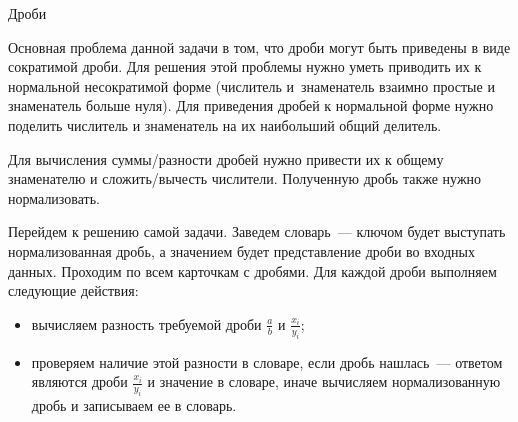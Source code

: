 \begin{tutorial}{Дроби}

Основная проблема данной задачи в том, что дроби могут быть приведены в виде сократимой дроби. Для решения этой проблемы нужно уметь приводить их к нормальной несократимой форме (числитель и~знаменатель взаимно простые и знаменатель больше нуля). Для приведения дробей к нормальной форме нужно поделить числитель и знаменатель на их наибольший общий делитель.

Для вычисления суммы/разности дробей нужно привести их к общему знаменателю и сложить/вычесть числители. Полученную дробь также нужно нормализовать.

Перейдем к решению самой задачи. Заведем словарь~--- ключом будет выступать нормализованная дробь, а значением будет представление дроби во входных данных. Проходим по всем карточкам с дробями. Для каждой дроби выполняем следующие действия:
\begin {itemize}
\item вычисляем разность требуемой дроби $\frac{a}{b}$ и $\frac{x_i}{y_i}$;
\item проверяем наличие этой разности в словаре, если дробь нашлась~--- ответом являются дроби $\frac{x_i}{y_i}$ и значение в словаре, иначе вычисляем нормализованную дробь и записываем ее в словарь.
\end{itemize}

\end{tutorial}

